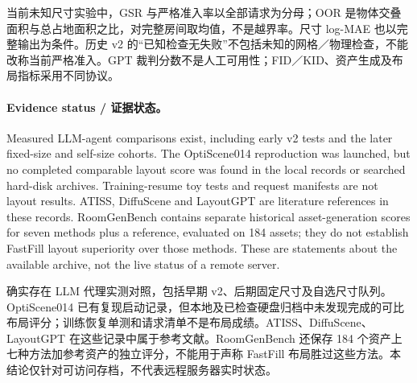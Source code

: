 \documentclass[10pt,a4paper,fontset=fandol]{ctexart}
\begin{document}
当前未知尺寸实验中，GSR 与严格准入率以全部请求为分母；OOR 是物体交叠面积与总占地面积之比，对完整房间取均值，不是越界率。尺寸 log-MAE 也以完整输出为条件。历史 v2 的“已知检查无失败”不包括未知的网格／物理检查，不能改称当前严格准入。GPT 裁判分数不是人工可用性；FID／KID、资产生成及布局指标采用不同协议。

\paragraph{Evidence status / 证据状态。}
Measured LLM-agent comparisons exist, including early v2 tests and the later fixed-size and self-size cohorts. The OptiScene014 reproduction was launched, but no completed comparable layout score was found in the local records or searched hard-disk archives. Training-resume toy tests and request manifests are not layout results. ATISS, DiffuScene and LayoutGPT are literature references in these records. RoomGenBench contains separate historical asset-generation scores for seven methods plus a reference, evaluated on 184 assets; they do not establish FastFill layout superiority over those methods. These are statements about the available archive, not the live status of a remote server.

确实存在 LLM 代理实测对照，包括早期 v2、后期固定尺寸及自选尺寸队列。OptiScene014 已有复现启动记录，但本地及已检查硬盘归档中未发现完成的可比布局评分；训练恢复单测和请求清单不是布局成绩。ATISS、DiffuScene、LayoutGPT 在这些记录中属于参考文献。RoomGenBench 还保存 184 个资产上七种方法加参考资产的独立评分，不能用于声称 FastFill 布局胜过这些方法。本结论仅针对可访问存档，不代表远程服务器实时状态。
\tableofcontents
\clearpage
\end{document}
